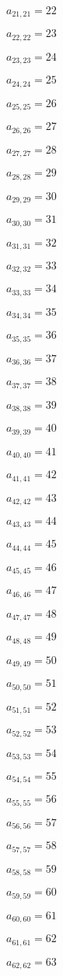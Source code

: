 \documentclass[a4paper,12pt]{article}
\begin{document}
$a _{ 21, 21 } = 22$

$a _{ 22, 22 } = 23$

$a _{ 23, 23 } = 24$

$a _{ 24, 24 } = 25$

$a _{ 25, 25 } = 26$

$a _{ 26, 26 } = 27$

$a _{ 27, 27 } = 28$

$a _{ 28, 28 } = 29$

$a _{ 29, 29 } = 30$

$a _{ 30, 30 } = 31$

$a _{ 31, 31 } = 32$

$a _{ 32, 32 } = 33$

$a _{ 33, 33 } = 34$

$a _{ 34, 34 } = 35$

$a _{ 35, 35 } = 36$

$a _{ 36, 36 } = 37$

$a _{ 37, 37 } = 38$

$a _{ 38, 38 } = 39$

$a _{ 39, 39 } = 40$

$a _{ 40, 40 } = 41$

$a _{ 41, 41 } = 42$

$a _{ 42, 42 } = 43$

$a _{ 43, 43 } = 44$

$a _{ 44, 44 } = 45$

$a _{ 45, 45 } = 46$

$a _{ 46, 46 } = 47$

$a _{ 47, 47 } = 48$

$a _{ 48, 48 } = 49$

$a _{ 49, 49 } = 50$

$a _{ 50, 50 } = 51$

$a _{ 51, 51 } = 52$

$a _{ 52, 52 } = 53$

$a _{ 53, 53 } = 54$

$a _{ 54, 54 } = 55$

$a _{ 55, 55 } = 56$

$a _{ 56, 56 } = 57$

$a _{ 57, 57 } = 58$

$a _{ 58, 58 } = 59$

$a _{ 59, 59 } = 60$

$a _{ 60, 60 } = 61$

$a _{ 61, 61 } = 62$

$a _{ 62, 62 } = 63$
\end{document}
